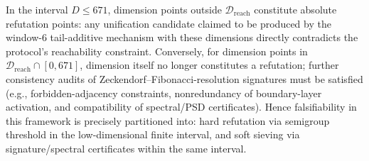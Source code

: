 \begin{proposition}\label{prop:xi-window6-falsifiability-layering-from-semigroup}
In the interval \(D\le 671\), dimension points outside \(\mathcal D_{\mathrm{reach}}\) constitute absolute refutation points: any unification candidate claimed to be produced by the window-\(6\) tail-additive mechanism with these dimensions directly contradicts the protocol's reachability constraint.
Conversely, for dimension points in \(\mathcal D_{\mathrm{reach}}\cap[0,671]\), dimension itself no longer constitutes a refutation; further consistency audits of Zeckendorf--Fibonacci-resolution signatures must be satisfied (e.g., forbidden-adjacency constraints, nonredundancy of boundary-layer activation, and compatibility of spectral/PSD certificates).
Hence falsifiability in this framework is precisely partitioned into: hard refutation via semigroup threshold in the low-dimensional finite interval, and soft sieving via signature/spectral certificates within the same interval.
\end{proposition}
